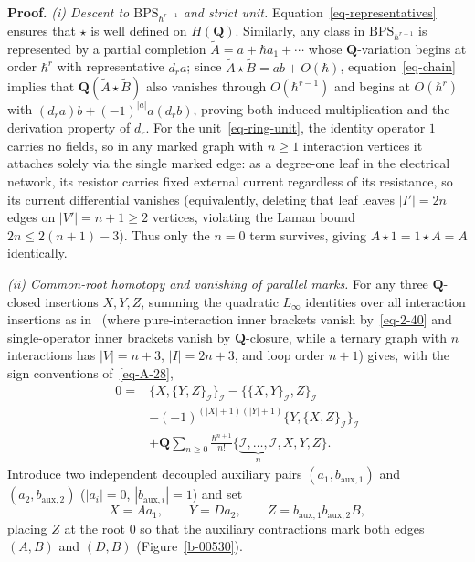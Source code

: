 \documentclass[11pt]{article}
\numberwithin{equation}{section}
\numberwithin{figure}{section}
\numberwithin{table}{section}
\begin{document}
\begin{proofbox}
\textbf{Proof.} \emph{(i) Descent to $\mathrm{BPS}_{\hbar^{r-1}}$ and strict unit.} Equation~\eqref{eq-representatives} ensures that $\star$ is well defined on $H(\mathbf Q)$. Similarly, any class in $\mathrm{BPS}_{\hbar^{r-1}}$ is represented by a partial completion $\tilde A=a+\hbar a_1+\cdots$ whose $\mathbf Q$-variation begins at order $\hbar^r$ with representative $d_ra$; since $\tilde A\star\tilde B=ab+O(\hbar)$, equation~\eqref{eq-chain} implies that $\mathbf Q(\tilde A\star\tilde B)$ also vanishes through $O(\hbar^{r-1})$ and begins at $O(\hbar^r)$ with $(d_ra)b+(-1)^{|a|}a(d_rb)$, proving both induced multiplication and the derivation property of $d_r$. For the unit~\eqref{eq-ring-unit}, the identity operator $1$ carries no fields, so in any marked graph with $n\ge1$ interaction vertices it attaches solely via the single marked edge: as a degree-one leaf in the electrical network, its resistor carries fixed external current regardless of its resistance, so its current differential vanishes (equivalently, deleting that leaf leaves $|I'|=2n$ edges on $|V'|=n+1\ge2$ vertices, violating the Laman bound $2n\le2(n+1)-3$). Thus only the $n=0$ term survives, giving $A\star1=1\star A=A$ identically.

\emph{(ii) Common-root homotopy and vanishing of parallel marks.} For any three $\mathbf Q$-closed insertions $X,Y,Z$, summing the quadratic $L_\infty$ identities over all interaction insertions as in~\cite[Sections 4.3 and 4.5]{higher} (where pure-interaction inner brackets vanish by~\eqref{eq-2-40} and single-operator inner brackets vanish by $\mathbf Q$-closure, while a ternary graph with $n$ interactions has $|V|=n+3$, $|I|=2n+3$, and loop order $n+1$) gives, with the sign conventions of~\eqref{eq-A-28},
\begin{equation}\label{eq-ring-twisted-jacobi}
\begin{aligned}
0={}&\{X,\{Y,Z\}_{\mathcal I}\}_{\mathcal I}
-\{\{X,Y\}_{\mathcal I},Z\}_{\mathcal I}\\
&-(-1)^{(|X|+1)(|Y|+1)}
\{Y,\{X,Z\}_{\mathcal I}\}_{\mathcal I}\\
&+\mathbf Q\sum_{n\ge0}\frac{\hbar^{n+1}}{n!}
\bigl\{\underbrace{\mathcal I,\ldots,\mathcal I}_{n},X,Y,Z\bigr\}.
\end{aligned}
\end{equation}
Introduce two independent decoupled auxiliary pairs $(a_1,b_{\mathrm{aux},1})$ and $(a_2,b_{\mathrm{aux},2})$ ($|a_i|=0$, $|b_{\mathrm{aux},i}|=1$) and set
\begin{equation*}
X=Aa_1,\qquad Y=Da_2,\qquad
Z=b_{\mathrm{aux},1}b_{\mathrm{aux},2}B,
\end{equation*}
placing $Z$ at the root $0$ so that the auxiliary contractions mark both edges $(A,B)$ and $(D,B)$ (Figure~\ref{b-00530}).


\end{proofbox}
\end{document}
